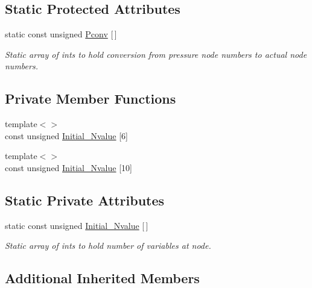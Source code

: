 \subsection*{Static Protected Attributes}
\begin{DoxyCompactItemize}
\item 
static const unsigned \hyperlink{classoomph_1_1TTaylorHoodElement_ae03a113811196f41d3d3a4b5fd6d60c9}{Pconv} \mbox{[}$\,$\mbox{]}
\begin{DoxyCompactList}\small\item\em Static array of ints to hold conversion from pressure node numbers to actual node numbers. \end{DoxyCompactList}\end{DoxyCompactItemize}
\subsection*{Private Member Functions}
\begin{DoxyCompactItemize}
\item 
{\footnotesize template$<$$>$ }\\const unsigned \hyperlink{classoomph_1_1TTaylorHoodElement_aa5d902a87683efbc78045e4c01ab3d58}{Initial\+\_\+\+Nvalue} \mbox{[}6\mbox{]}
\item 
{\footnotesize template$<$$>$ }\\const unsigned \hyperlink{classoomph_1_1TTaylorHoodElement_ae560bd9e8c6c135e9d6218c959ea4533}{Initial\+\_\+\+Nvalue} \mbox{[}10\mbox{]}
\end{DoxyCompactItemize}
\subsection*{Static Private Attributes}
\begin{DoxyCompactItemize}
\item 
static const unsigned \hyperlink{classoomph_1_1TTaylorHoodElement_a3b1c1055569f41cccf1d9b32a9d20a41}{Initial\+\_\+\+Nvalue} \mbox{[}$\,$\mbox{]}
\begin{DoxyCompactList}\small\item\em Static array of ints to hold number of variables at node. \end{DoxyCompactList}\end{DoxyCompactItemize}
\subsection*{Additional Inherited Members}


